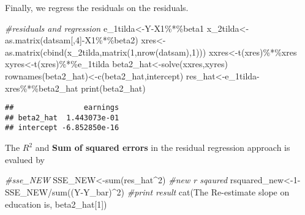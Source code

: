 \documentclass[
]{article}
\newenvironment{Shaded}{\begin{snugshade}}{\end{snugshade}}
\newcommand{\CommentTok}[1]{\textcolor[rgb]{0.56,0.35,0.01}{\textit{#1}}}
\newcommand{\DecValTok}[1]{\textcolor[rgb]{0.00,0.00,0.81}{#1}}
\newcommand{\FunctionTok}[1]{\textcolor[rgb]{0.00,0.00,0.00}{#1}}
\newcommand{\NormalTok}[1]{#1}
\newcommand{\OtherTok}[1]{\textcolor[rgb]{0.56,0.35,0.01}{#1}}
\newcommand{\SpecialCharTok}[1]{\textcolor[rgb]{0.00,0.00,0.00}{#1}}
\newcommand{\StringTok}[1]{\textcolor[rgb]{0.31,0.60,0.02}{#1}}
\begin{document}
Finally, we regress the residuals on the residuals.

\begin{Shaded}
\begin{Highlighting}[]
\CommentTok{\#residuals and regression}
\NormalTok{e\_1tilda}\OtherTok{\textless{}{-}}\NormalTok{Y}\SpecialCharTok{{-}}\NormalTok{X1}\SpecialCharTok{\%*\%}\NormalTok{beta1}
\NormalTok{x\_2tilda}\OtherTok{\textless{}{-}}\FunctionTok{as.matrix}\NormalTok{(datsam[,}\DecValTok{4}\NormalTok{]}\SpecialCharTok{{-}}\NormalTok{X1}\SpecialCharTok{\%*\%}\NormalTok{beta2)}
\NormalTok{xres}\OtherTok{\textless{}{-}}\FunctionTok{as.matrix}\NormalTok{(}\FunctionTok{cbind}\NormalTok{(x\_2tilda,}\FunctionTok{matrix}\NormalTok{(}\DecValTok{1}\NormalTok{,}\FunctionTok{nrow}\NormalTok{(datsam),}\DecValTok{1}\NormalTok{)))}
\NormalTok{xxres}\OtherTok{\textless{}{-}}\FunctionTok{t}\NormalTok{(xres)}\SpecialCharTok{\%*\%}\NormalTok{xres}
\NormalTok{xyres}\OtherTok{\textless{}{-}}\FunctionTok{t}\NormalTok{(xres)}\SpecialCharTok{\%*\%}\NormalTok{e\_1tilda}
\NormalTok{beta2\_hat}\OtherTok{\textless{}{-}}\FunctionTok{solve}\NormalTok{(xxres,xyres)}
\FunctionTok{rownames}\NormalTok{(beta2\_hat)}\OtherTok{\textless{}{-}}\FunctionTok{c}\NormalTok{(}\StringTok{\textquotesingle{}beta2\_hat\textquotesingle{}}\NormalTok{,}\StringTok{\textquotesingle{}intercept\textquotesingle{}}\NormalTok{)}
\NormalTok{res\_hat}\OtherTok{\textless{}{-}}\NormalTok{e\_1tilda}\SpecialCharTok{{-}}\NormalTok{xres}\SpecialCharTok{\%*\%}\NormalTok{beta2\_hat}
\FunctionTok{print}\NormalTok{(beta2\_hat)}
\end{Highlighting}
\end{Shaded}

\begin{verbatim}
##                earnings
## beta2_hat  1.443073e-01
## intercept -6.852850e-16
\end{verbatim}

The \(R^2\) and \textbf{Sum of squared errors} in the residual
regression approach is evalued by

\begin{Shaded}
\begin{Highlighting}[]
\CommentTok{\#sse\_NEW}
\NormalTok{SSE\_NEW}\OtherTok{\textless{}{-}}\FunctionTok{sum}\NormalTok{(res\_hat}\SpecialCharTok{\^{}}\DecValTok{2}\NormalTok{)}
\CommentTok{\#new r sqaured}
\NormalTok{rsquared\_new}\OtherTok{\textless{}{-}}\DecValTok{1}\SpecialCharTok{{-}}\NormalTok{SSE\_NEW}\SpecialCharTok{/}\FunctionTok{sum}\NormalTok{((Y}\SpecialCharTok{{-}}\NormalTok{Y\_bar)}\SpecialCharTok{\^{}}\DecValTok{2}\NormalTok{)}
\CommentTok{\#print result}
\FunctionTok{cat}\NormalTok{(}\StringTok{\textquotesingle{}The Re{-}estimate  slope on education is\textquotesingle{}}\NormalTok{, beta2\_hat[}\DecValTok{1}\NormalTok{])}
\end{Highlighting}
\end{Shaded}
\end{document}
